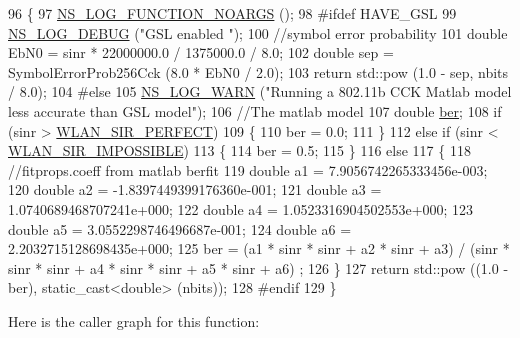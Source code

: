 \begin{DoxyCode}
96 \{
97   \hyperlink{log-macros-disabled_8h_a8f7e4afc291c9d29a65c18ac1f79197b}{NS\_LOG\_FUNCTION\_NOARGS} ();
98 \textcolor{preprocessor}{#ifdef HAVE\_GSL}
99   \hyperlink{group__logging_ga413f1886406d49f59a6a0a89b77b4d0a}{NS\_LOG\_DEBUG} (\textcolor{stringliteral}{"GSL enabled "});
100   \textcolor{comment}{//symbol error probability}
101   \textcolor{keywordtype}{double} EbN0 = sinr * 22000000.0 / 1375000.0 / 8.0;
102   \textcolor{keywordtype}{double} sep = SymbolErrorProb256Cck (8.0 * EbN0 / 2.0);
103   \textcolor{keywordflow}{return} std::pow (1.0 - sep, nbits / 8.0);
104 \textcolor{preprocessor}{#else}
105   \hyperlink{group__logging_gade7208b4009cdf0e25783cd26766f559}{NS\_LOG\_WARN} (\textcolor{stringliteral}{"Running a 802.11b CCK Matlab model less accurate than GSL model"});
106   \textcolor{comment}{//The matlab model}
107   \textcolor{keywordtype}{double} \hyperlink{lte__cqi__generation_8m_a197619a3539acfc577325d6e41b6ce95}{ber};
108   \textcolor{keywordflow}{if} (sinr > \hyperlink{classns3_1_1DsssErrorRateModel_a30cb6e7959e79909c2ca9ce7170e7fc1}{WLAN\_SIR\_PERFECT})
109     \{
110       ber = 0.0;
111     \}
112   \textcolor{keywordflow}{else} \textcolor{keywordflow}{if} (sinr < \hyperlink{classns3_1_1DsssErrorRateModel_ab2d065a2e6978215da5fc5a1c8d74a37}{WLAN\_SIR\_IMPOSSIBLE})
113     \{
114       ber = 0.5;
115     \}
116   \textcolor{keywordflow}{else}
117     \{
118       \textcolor{comment}{//fitprops.coeff from matlab berfit}
119       \textcolor{keywordtype}{double} a1 = 7.9056742265333456e-003;
120       \textcolor{keywordtype}{double} a2 = -1.8397449399176360e-001;
121       \textcolor{keywordtype}{double} a3 = 1.0740689468707241e+000;
122       \textcolor{keywordtype}{double} a4 = 1.0523316904502553e+000;
123       \textcolor{keywordtype}{double} a5 = 3.0552298746496687e-001;
124       \textcolor{keywordtype}{double} a6 = 2.2032715128698435e+000;
125       ber =  (a1 * sinr * sinr + a2 * sinr + a3) / (sinr * sinr * sinr + a4 * sinr * sinr + a5 * sinr + a6)
      ;
126     \}
127   \textcolor{keywordflow}{return} std::pow ((1.0 - ber), static\_cast<double> (nbits));
128 \textcolor{preprocessor}{#endif}
129 \}
\end{DoxyCode}


Here is the caller graph for this function\+:


